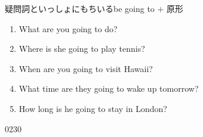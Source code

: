 \documentclass[aspectratio=169,xcolor={dvipsnames,table}]{beamer}
\newcommand{\myaudio}[1]{\href{#1}{\faVolumeUp}}
\begin{document}
\begin{frame}[plain]{疑問詞といっしょにもちいるbe going to $+$ 原形}
 \begin{block}{}
  
\begin{enumerate}
 \item What are you going to do?
 \item Where is she going to play tennis?
 \item When are you going to visit Hawaii?
 \item What time are they going to wake up tomorrow?
 \item How long is he going to stay in London?
\end{enumerate}
 \end{block}


\hfill{\tiny 0230}\,{\scriptsize \myaudio{./audio/011_be_going_to_18.mp3}}
\end{frame}
\end{document}

